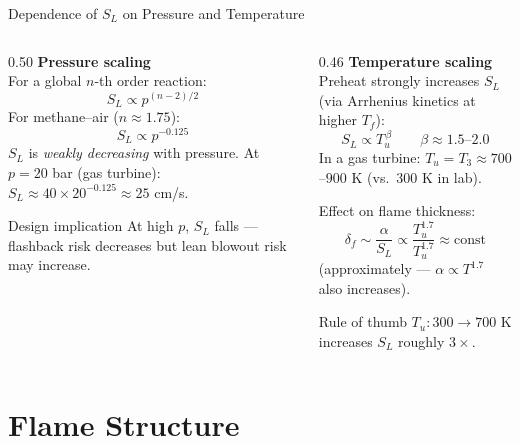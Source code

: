 \documentclass[12pt,aspectratio=169]{beamer}
\newcommand{\SL}{S_L}
\newcommand{\lf}{\delta_f}
\newcommand{\alphath}{\alpha}
\begin{document}
\begin{frame}{Dependence of $\SL$ on Pressure and Temperature}

  \begin{columns}[t]
    \begin{column}{0.50\textwidth}
      \textbf{Pressure scaling}\\
      For a global $n$-th order reaction:
      \[
        \SL \propto p^{(n-2)/2}
      \]
      For methane--air ($n \approx 1.75$):
      \[
        \SL \propto p^{-0.125}
      \]
      $\SL$ is \emph{weakly decreasing} with pressure.
      At $p = 20$ bar (gas turbine):
      $\SL \approx 40 \times 20^{-0.125} \approx 25$ cm/s.

      \vspace{3pt}
      \begin{alertblock}{Design implication}
        At high $p$, $\SL$ falls --- flashback risk decreases
        but lean blowout risk may increase.
      \end{alertblock}
    \end{column}
    \begin{column}{0.46\textwidth}
      \textbf{Temperature scaling}\\
      Preheat strongly increases $\SL$
      (via Arrhenius kinetics at higher $T_f$):
      \[
        \SL \propto T_u^{\,\beta}
        \qquad \beta \approx 1.5\text{--}2.0
      \]
      In a gas turbine: $T_u = T_3 \approx 700$--$900$ K
      (vs.\ 300 K in lab).

      Effect on flame thickness:
      \[
        \lf \sim \frac{\alphath}{\SL}
        \propto \frac{T_u^{1.7}}{T_u^{1.7}} \approx \text{const}
      \]
      (approximately --- $\alphath \propto T^{1.7}$ also increases).

      \vspace{3pt}
      \begin{exampleblock}{Rule of thumb}
        $T_u: 300 \to 700$ K increases
        $\SL$ roughly $3\times$.
      \end{exampleblock}
    \end{column}
  \end{columns}
\end{frame}

\section{Flame Structure}
\end{document}

